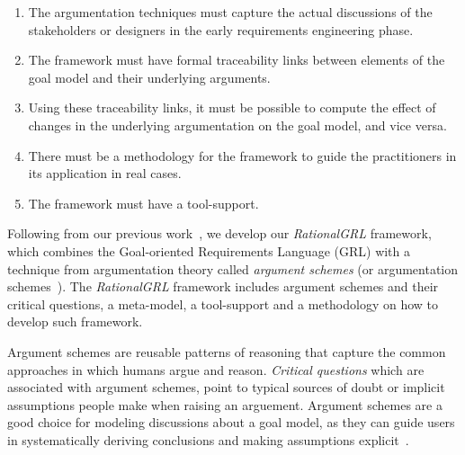 \begin{enumerate}
\item 
The argumentation techniques must capture the actual discussions of the stakeholders or designers in the early requirements engineering phase.
\item 
The framework must have formal traceability links between elements of the goal model and their underlying arguments.
\item 
Using these traceability links, it must be possible to compute the effect of changes in the underlying argumentation on the goal model, and vice versa.
\item 
There must be a methodology for the framework to guide the practitioners in its application in real cases.
\item 
The framework must have a tool-support.
\end{enumerate}




Following from our previous work~\cite{vanzee-etal:renext2015,vanZee-etal:er2016}, we develop our \emph{RationalGRL} framework, which combines the Goal-oriented Requirements Language (GRL) \cite{Amyot:2010:EGM:1841349.1841356} with a technique from argumentation theory called \emph{argument schemes} (or argumentation schemes~\cite{walton-etal2008}). The \emph{RationalGRL} framework includes argument schemes and their critical questions, a meta-model, a tool-support and a methodology on how to develop such framework. 

Argument schemes are reusable patterns of reasoning that capture the common approaches in which humans argue and reason. \emph{Critical questions} which are associated with argument schemes, point to typical sources of doubt or implicit assumptions people make when raising an arguement. Argument schemes are a good choice for modeling discussions about a goal model, as they can guide users in systematically deriving conclusions and making assumptions explicit~\cite{murukannaiah2015}. 

